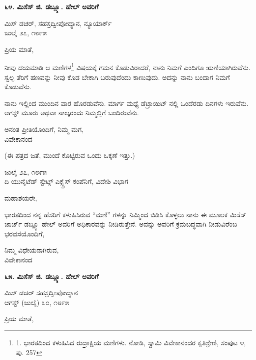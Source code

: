 \begin{center}
\textbf{೬೪. ಮಿಸೆಸ್ ಜಿ. ಡಬ್ಲ್ಯೂ. ಹೇಲ್ ಅವರಿಗೆ}
\end{center}

\begin{flushright}
 ಮಿಸ್ ಡಚರ್, ಸಹಸ್ರದ್ವೀಪೋದ್ಯಾನ, ನ್ಯೂಯಾರ್ಕ್\\ಜುಲೈ ೨೭, ೧೮೯೫
\end{flushright}

ಪ್ರಿಯ ಮಾತೆ,

ನೀವು ದಯಮಾಡಿ ಆ ಮಣಿಗಳ\footnote{1. ಭಾರತದಿಂದ ಕಳುಹಿಸಿದ ರುದ್ರಾಕ್ಷಿಯ ಮಣಿಗಳು. ನೋಡಿ, ಸ್ವಾಮಿ ವಿವೇಕಾನಂದರ ಕೃತಿಶ್ರೇಣಿ, ಸಂಪುಟ ೪, ಪು. 257} ವಿಷಯಕ್ಕೆ ಗಮನ ಕೊಡುವಿರಾದರೆ, ನಾನು ನಿಮಗೆ ಎಂದಿಗೂ ಋಣಿಯಾಗಿರುವೆನು. ಸ್ವಲ್ಪ ತೆರಿಗೆ ಹಣವನ್ನು ನೀವು ಕೊಡ ಬೇಕಾಗಿ ಬರುವುದೆಂದು ಕಾಣುವುದು. ಅದನ್ನು ನಾನು ಬಂದಾಗ ನಿಮಗೆ ಕೊಡುವೆನು.

ನಾನು ಇಲ್ಲಿಂದ ಮುಂದಿನ ವಾರ ಹೊರಡುವೆನು. ಮಾರ್ಗ ಮಧ್ಯೆ ಡೆಟ್ರಾಯಿಟ್ ನಲ್ಲಿ ಒಂದೆರಡು ದಿನಗಳು ಇರುವೆನು. ಆಗಸ್ಟ್ ಮೂರು ಅಥವಾ ನಾಲ್ಕರಂದು ನಿಮ್ಮಲ್ಲಿಗೆ ಬಂದಿರುವೆನು.

\begin{flushright}
ಅನಂತ ಪ್ರೀತಿಯೊಂದಿಗೆ, ನಿಮ್ಮ ಮಗ,\\ವಿವೇಕಾನಂದ
\end{flushright}

(ಈ ಪತ್ರದ ಜತೆ, ಮುಂದೆ ಕೊಟ್ಟಿರುವ ಒಂದು ಒಕ್ಕಣೆ ಇತ್ತು.)

\begin{flushright}
ಜುಲೈ ೨೭, ೧೮೯೫\\ದಿ ಯುನೈಟೆಡ್ ಸ್ಟೇಟ್ಸ್ ಎಕ್ಸ್ಪ್ರೆಸ್ ಕಂಪೆನಿಗೆ, ವಿದೇಶಿ ವಿಭಾಗ
\end{flushright}

ಮಹಾಶಯರೇ,

ಭಾರತದಿಂದ ನನ್ನ ಹೆಸರಿಗೆ ಕಳುಹಿಸಿರುವ “ಮಣಿ” ಗಳನ್ನು ನಿಮ್ಮಿಂದ ಬಿಡಿಸಿ ಕೊಳ್ಳಲು ನಾನು ಈ ಮೂಲಕ ಮಿಸೆಸ್ ಜಾರ್ಜ್ ಡಬ್ಲ್ಯೂ ಹೇಲ್ ಅವರಿಗೆ ಅಧಿಕಾರವನ್ನು ನೀಡಿರುತ್ತೇನೆ. ಅವನ್ನು ಅವರಿಗೆ ಕ್ರಮಬದ್ಧವಾಗಿ ನೀಡುವಿರೆಂಬ ಭರವಸೆಯೊಂದಿಗೆ,

\begin{flushright}
ನಿಮ್ಮ ವಿಧೇಯನಾಗಿರುವ,\\ವಿವೇಕಾನಂದ
\end{flushright}

\begin{center}
\textbf{೬೫. ಮಿಸೆಸ್ ಜಿ. ಡಬ್ಲ್ಯೂ. ಹೇಲ್ ಅವರಿಗೆ}
\end{center}

\begin{flushright}
 ಮಿಸ್ ಡಚರ್ ಸಹಸ್ರದ್ವೀಪೋದ್ಯಾನ\\ಆಗಸ್ಟ್ (ಜುಲೈ) ೩೦, ೧೮೯೫
\end{flushright}

ಪ್ರಿಯ ಮಾತೆ,

